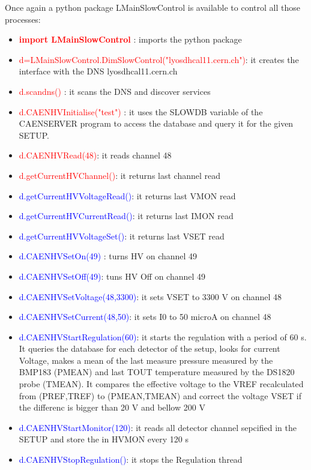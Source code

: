 \documentclass[english]{article}
\begin{document}
Once again a python package LMainSlowControl is available to control all those processes:
\begin{itemize}
\item \textcolor{red}{ \bf  import LMainSlowControl} :  imports the python package
\item \textcolor{red}{d=LMainSlowControl.DimSlowControl("lyosdhcal11.cern.ch")}: it creates the interface with the DNS lyosdhcal11.cern.ch
\item \textcolor{red}{d.scandns() }: it scans the DNS and discover services 
\item \textcolor{red}{d.CAENHVInitialise("test") }: it uses the SLOWDB variable of the CAENSERVER program to access the database and query it for the given SETUP.
\item \textcolor{red}{d.CAENHVRead(48)}: it reads channel 48
\item \textcolor{red}{d.getCurrentHVChannel()}: it returns last channel read 
\item \textcolor{blue}{d.getCurrentHVVoltageRead()}: it returns last VMON read
\item \textcolor{blue}{d.getCurrentHVCurrentRead()}: it returns last IMON read
\item \textcolor{blue}{d.getCurrentHVVoltageSet()}: it returns last VSET read
\item \textcolor{blue}{d.CAENHVSetOn(49)} : turns HV on channel 49
\item \textcolor{blue}{d.CAENHVSetOff(49)}: tuns HV Off on channel 49
\item \textcolor{blue}{d.CAENHVSetVoltage(48,3300)}: it sets VSET to 3300 V on channel 48
\item \textcolor{blue}{d.CAENHVSetCurrent(48,50)}: it sets I0 to 50 microA on channel 48
\item \textcolor{blue}{d.CAENHVStartRegulation(60)}: it starts the regulation with a period of 60 s. It queries the database for each detector of the setup, looks for current Voltage, makes a mean of the last measure pressure measured by the BMP183 (PMEAN)  and last TOUT temperature measured by the DS1820 probe (TMEAN). It compares the effective voltage to the VREF recalculated from (PREF,TREF) to (PMEAN,TMEAN) and correct the voltage VSET if the differenc is bigger than 20 V and bellow 200 V
\item \textcolor{blue}{d.CAENHVStartMonitor(120)}: it reads all detector channel sepcified in the SETUP and store the in HVMON every 120 s
\item \textcolor{blue}{d.CAENHVStopRegulation()}: it stops the Regulation thread

\end{itemize}
\end{document}
